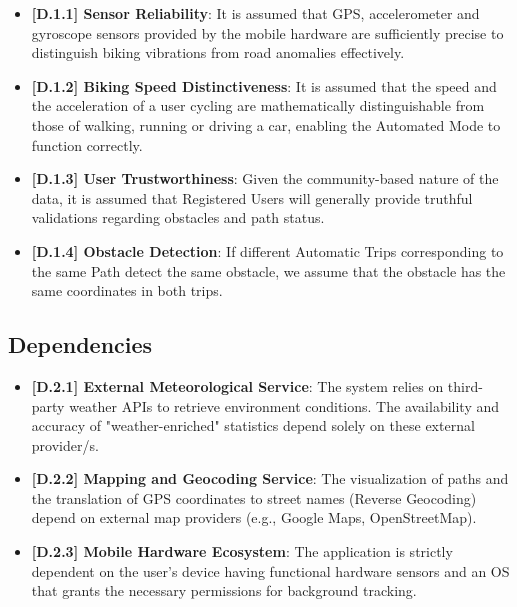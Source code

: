 \begin{itemize}
    \item \textbf{[D.1.1] Sensor Reliability}: It is assumed that GPS, accelerometer and gyroscope sensors provided by the mobile hardware are sufficiently precise to distinguish biking vibrations from road anomalies effectively.

    \item \textbf{[D.1.2] Biking Speed Distinctiveness}: It is assumed that the speed and the acceleration of a user cycling are mathematically distinguishable from those of walking, running or driving a car, enabling the Automated Mode to function correctly.

    \item \textbf{[D.1.3] User Trustworthiness}: Given the community-based nature of the data, it is assumed that Registered Users will generally provide truthful validations regarding obstacles and path status.

    \item \textbf{[D.1.4] Obstacle Detection}: If different Automatic Trips corresponding to the same Path detect the same obstacle, we assume that the obstacle has the same coordinates in both trips.
    
\end{itemize}

\subsection{Dependencies}

\begin{itemize}
    \item \textbf{[D.2.1] External Meteorological Service}: The system relies on third-party weather APIs to retrieve environment conditions. The availability and accuracy of "weather-enriched" statistics depend solely on these external provider/s.

    \item \textbf{[D.2.2] Mapping and Geocoding Service}: The visualization of paths and the translation of GPS coordinates to street names (Reverse Geocoding) depend on external map providers (e.g., Google Maps, OpenStreetMap).

    \item \textbf{[D.2.3] Mobile Hardware Ecosystem}: The application is strictly dependent on the user's device having functional hardware sensors and an OS that grants the necessary permissions for background tracking.
\end{itemize}

